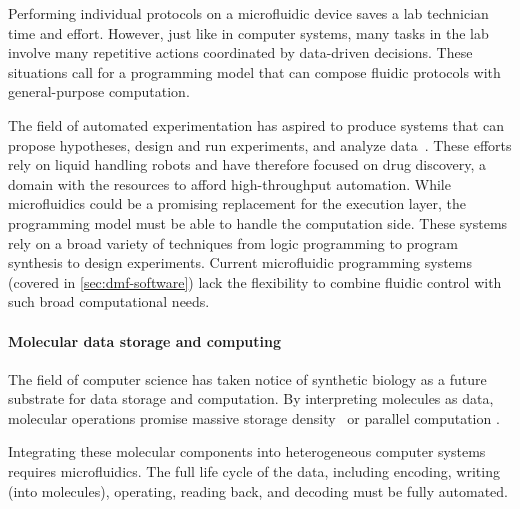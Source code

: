 \documentclass{jpaper}
\begin{document}
Performing individual protocols on a microfluidic device saves a lab technician time and effort.
However, just like in computer systems, many tasks in the lab involve many repetitive actions coordinated by data-driven decisions.
These situations call for a programming model that can compose fluidic protocols with general-purpose computation.

The field of automated experimentation has aspired to produce systems that can propose hypotheses, design and run experiments, and analyze data~\cite{king85, king2004, schneider2017automating, sparkes2010towards}.
These efforts rely on liquid handling robots and have therefore focused on drug discovery, a domain with the resources to afford high-throughput automation.
While microfluidics could be a promising replacement for the execution layer, the programming model must be able to handle the computation side.
These systems rely on a broad variety of techniques from logic programming \cite{king85} to program synthesis \cite{koksal2013} to design experiments.
Current microfluidic programming systems (covered in \autoref{sec:dmf-software}) lack the flexibility to combine fluidic control with such broad computational needs.

\paragraph{Molecular data storage and computing}

The field of computer science has taken notice of synthetic biology as a future substrate for data storage and computation.
By interpreting molecules as data, molecular operations promise massive storage density~\cite{nbt, goldman2013towards} or parallel computation \cite{stewart18, qian2011scaling}.

Integrating these molecular components into heterogeneous computer systems requires microfluidics.
The full life cycle of the data, including encoding, writing (into molecules), operating, reading back, and decoding must be fully automated.
\end{document}
